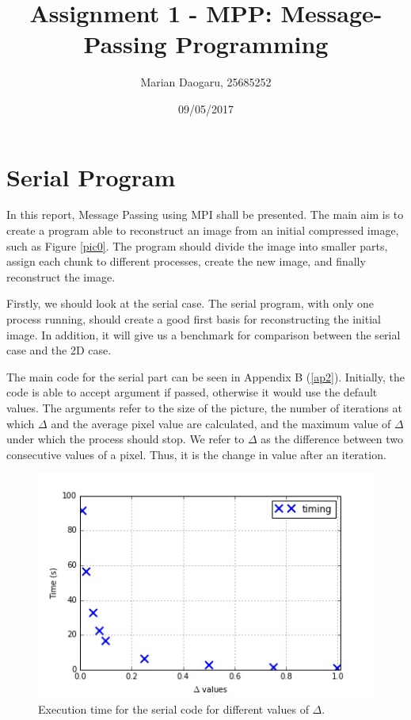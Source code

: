 \documentclass[11pt]{article}
\title{Assignment 1 - MPP: Message-Passing Programming}
\author{Marian Daogaru, 25685252}
\date{09/05/2017}
\begin{document}
	
	\maketitle
	\pagebreak
	\tableofcontents
	\pagebreak
	
	\section{Serial Program}
	
	In this report, Message Passing using MPI shall be presented. The main aim is to create a program able to reconstruct an image from an initial compressed image, such as Figure \ref{pic0}. The program should divide the image into smaller parts, assign each chunk to different processes, create the new image, and finally reconstruct the image. 
	
	Firstly, we should look at the serial case. The serial program, with only one process running, should create a good first basis for reconstructing the initial image. In addition, it will give us a benchmark for comparison between the serial case and the 2D case. 
	
	The main code for the serial part can be seen in Appendix B (\ref{ap2}). Initially, the code is able to accept argument if passed, otherwise it would use the default values. The arguments refer to the size of the picture, the number of iterations at which $\Delta$ and the average pixel value are calculated, and the maximum value of $\Delta$ under which the process should stop. 
	We refer to $\Delta$ as the difference between two consecutive values of a pixel. Thus, it is the change in value after an iteration.
	
	\begin{figure}[H]	
		\centering
		\includegraphics[scale=0.5]{serialvs3.jpeg}
		\caption{Execution time for the serial code for different values of $\Delta$.}\label{serial3}
	\end{figure}
	
\end{document}
